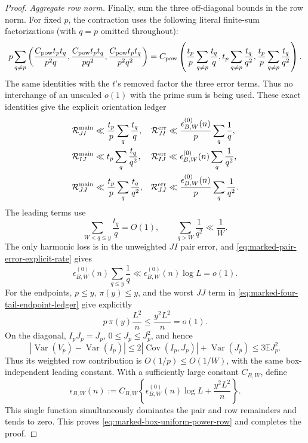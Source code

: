 \documentclass[11pt]{article}
\numberwithin{equation}{section}
\theoremstyle{definition}
\theoremstyle{remark}
\newcommand{\1}{\mathbf 1}
\begin{document}
\begin{proof}
\medskip\noindent\emph{Aggregate row norm.}\quad
Finally, sum the three off-diagonal bounds in the row norm.  For fixed
\(p\), the contraction uses the following literal finite-sum
factorizations (with \(q=p\) omitted throughout):
\[
 p\sum_{q\ne p}
 \left(\frac{C_{\rm pow}t_pt_q}{p^2q},
       \frac{C_{\rm pow}t_pt_q}{pq^2},
       \frac{C_{\rm pow}t_pt_q}{p^2q^2}\right)
 =C_{\rm pow}\left(\frac{t_p}{p}\sum_{q\ne p}\frac{t_q}{q},
          t_p\sum_{q\ne p}\frac{t_q}{q^2},
          \frac{t_p}{p}\sum_{q\ne p}\frac{t_q}{q^2}\right).
\]
The same identities with the \(t\)'s removed factor the three error
terms.  Thus no interchange of an unscaled \(o(1)\) with the prime sum is
being used.  These exact identities give the explicit orientation ledger
\begin{align}
 \mathcal R_{JI}^{\rm main}
 &\ll \frac{t_p}{p}\sum_q\frac{t_q}{q},
 &\mathcal R_{JI}^{\rm err}
 &\ll \frac{\epsilon^{(0)}_{B,W}(n)}p\sum_q\frac1q,\notag\\
 \mathcal R_{IJ}^{\rm main}
 &\ll t_p\sum_q\frac{t_q}{q^2},
 &\mathcal R_{IJ}^{\rm err}
 &\ll \epsilon^{(0)}_{B,W}(n)\sum_q\frac1{q^2},\notag\\
 \mathcal R_{JJ}^{\rm main}
 &\ll \frac{t_p}{p}\sum_q\frac{t_q}{q^2},
 &\mathcal R_{JJ}^{\rm err}
 &\ll \frac{\epsilon^{(0)}_{B,W}(n)}p\sum_q\frac1{q^2}.
 \label{eq:marked-row-orientation-ledger}
\end{align}
The leading terms use
\[
 \sum_{W<q\le y}\frac{t_q}{q}=O(1),\qquad
 \sum_{q>W}\frac1{q^2}\ll\frac1W.
\]
The only harmonic loss is in the unweighted \(JI\) pair error, and
\eqref{eq:marked-pair-error-explicit-rate} gives
\[
 \epsilon^{(0)}_{B,W}(n)\sum_{q\le y}\frac1q
 \ll\epsilon^{(0)}_{B,W}(n)\log L=o(1).
\]
For the endpoints, \(p\le y\), \(\pi(y)\le y\), and the worst \(JJ\)
term in \eqref{eq:marked-four-tail-endpoint-ledger} give explicitly
\[
 p\,\pi(y)\frac{L^2}{n}\le\frac{y^2L^2}{n}=o(1).
\]
On the
diagonal, \(I_pJ_p=J_p\), \(0\le J_p\le J_p^2\), and hence
\[
 |\operatorname{Var}(V_p)-\operatorname{Var}(I_p)|
 \le2|\operatorname{Cov}(I_p,J_p)|+\operatorname{Var}(J_p)
 \le3\mathbb E J_p^2.
\]
Thus its weighted row contribution is \(O(1/p)\le O(1/W)\), with the
same box-independent leading constant.  With a sufficiently large
constant \(C_{B,W}\), define
\[
 \epsilon_{B,W}(n):=C_{B,W}\left\{
   \epsilon^{(0)}_{B,W}(n)\log L+\frac{y^2L^2}{n}\right\}.
\]
This single function simultaneously dominates the pair and row
remainders and tends to zero.
This proves \eqref{eq:marked-box-uniform-power-row} and completes the
proof.
\end{proof}
\end{document}
